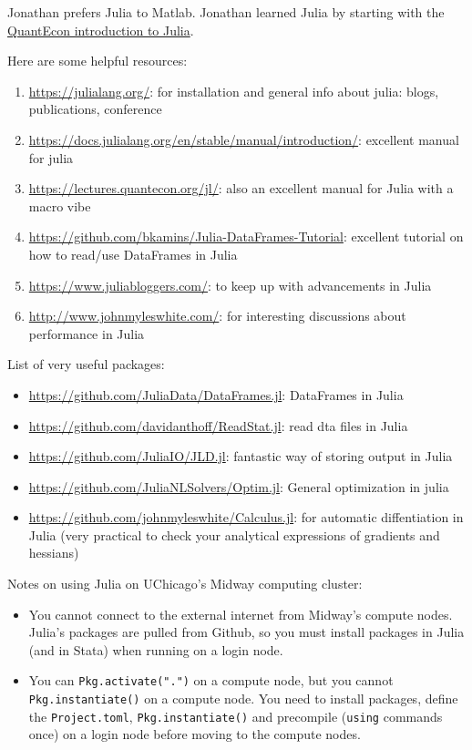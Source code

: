 Jonathan prefers Julia to Matlab.
Jonathan learned Julia by starting with the \href{https://lectures.quantecon.org/jl/index_learning_julia.html}{QuantEcon introduction to Julia}.

Here are some helpful resources:
\begin{enumerate}
\item \url{https://julialang.org/}: for installation and general info about julia: blogs, publications, conference
\item \url{https://docs.julialang.org/en/stable/manual/introduction/}: excellent manual for julia
\item \url{https://lectures.quantecon.org/jl/}: also an excellent manual for Julia with a macro vibe
\item \url{https://github.com/bkamins/Julia-DataFrames-Tutorial}: excellent tutorial on how to read/use DataFrames in Julia
\item \url{https://www.juliabloggers.com/}: to keep up with advancements in Julia
\item \url{http://www.johnmyleswhite.com/}: for interesting discussions about performance in Julia 
\end{enumerate}

List of very useful packages:
\begin{itemize}
\item \url{https://github.com/JuliaData/DataFrames.jl}: DataFrames in Julia
\item \url{https://github.com/davidanthoff/ReadStat.jl}: read dta files in Julia
\item \url{https://github.com/JuliaIO/JLD.jl}: fantastic way of storing output in Julia
\item \url{https://github.com/JuliaNLSolvers/Optim.jl}: General optimization in julia
\item \url{https://github.com/johnmyleswhite/Calculus.jl}: for automatic diffentiation in Julia (very practical to check your analytical expressions of gradients and hessians)
\end{itemize}

Notes on using Julia on UChicago's Midway computing cluster:
\begin{itemize}
	\item You cannot connect to the external internet from Midway's compute nodes. 
	Julia's packages are pulled from Github, so you must install packages in Julia (and in Stata) when running on a login node.
	\item You can \texttt{Pkg.activate(".")} on a compute node, but you cannot \texttt{Pkg.instantiate()} on a compute node. You need to install packages, define the \texttt{Project.toml}, \texttt{Pkg.instantiate()} and precompile (\texttt{using} commands once) on a login node before moving to the compute nodes.  
\end{itemize}
